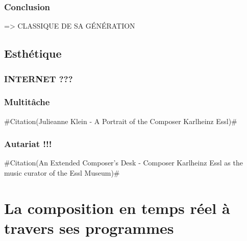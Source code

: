 \documentclass[a4paper,12pt]{article}
\newcommand{\zitat}[2]{\#Citation(#2)\#}
\begin{document}
\subsubsection{Conclusion}

=> CLASSIQUE DE SA GÉNÉRATION

\subsection{Esthétique}

\subsubsection{INTERNET ???}

\subsubsection{Multitâche}

\zitat{Essl's compositional output spans every possible medium: orchestral, chamber, musical theater/performance, live electronics, electronic computer music, real-time and meta compositions, meta-instruments, installations and soundscapes, film music, visuals, text compositions and works for solo instruments. Always looking to expand his creative output, Essl frequently collaborates with artists from other fields, including choreographers, dancers, visual artists, video artists, architects, poets, authors, and graffiti artists.}
{Julieanne Klein - A Portrait of the Composer Karlheinz Essl}	

\subsubsection{Autariat !!!}

\zitat{... with complete autonomy since without public funding
... the famous names of 20th-century music with a clear inclination towards the composers that happily pursued the spirit of modernism even through the post-modern era. Hardly a coincidence, since kHz considers himself as belonging to that ilk.}
{An Extended Composer’s Desk - Composer Karlheinz Essl as the music curator of the Essl Museum}



\section{La composition en temps réel à travers ses programmes}
\end{document}
